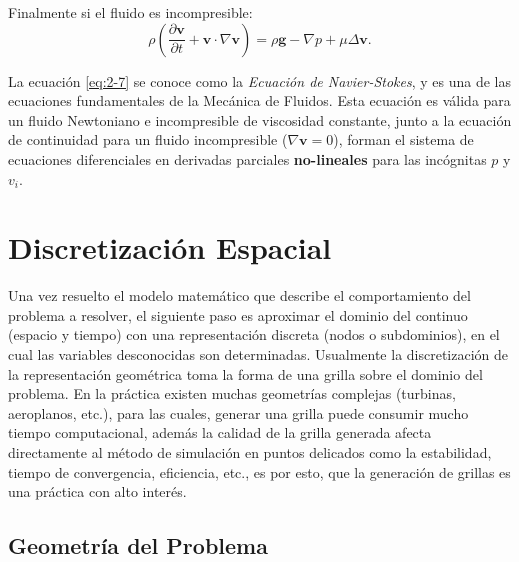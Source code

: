 \documentclass[a4paper,10pt, oneside]{book}
\begin{document}
Finalmente si el fluido es incompresible:
\begin{equation}
	\rho \left( \frac{\partial \mathbf{v}}{\partial t} + \mathbf{v} \cdot \nabla \mathbf{v} \right) = \rho \mathbf{g} -\nabla p + \mu \Delta \mathbf{v}.
	\label{eq:2-7}
\end{equation}

La ecuación \ref{eq:2-7} se conoce como la \textit{Ecuación de Navier-Stokes}, y es una de las ecuaciones fundamentales de la Mecánica de Fluidos. Esta ecuación es válida para un fluido Newtoniano e incompresible de viscosidad constante, junto a la ecuación de continuidad para un fluido incompresible ($\nabla \mathbf{v} = 0$), forman el sistema de ecuaciones diferenciales en derivadas parciales \textbf{no-lineales} para las incógnitas $p$ y $v_i$.

\chapter{Discretización Espacial}

Una vez resuelto el modelo matemático que describe el comportamiento del problema a resolver, el siguiente paso es aproximar el dominio del continuo (espacio y tiempo) con una representación discreta (nodos o subdominios), en el cual las variables desconocidas son determinadas. Usualmente la discretización de la representación geométrica toma la forma de una grilla sobre el dominio del problema. En la práctica existen muchas geometrías complejas (turbinas, aeroplanos, etc.), para las cuales, generar una grilla puede consumir mucho tiempo computacional, además la calidad de la grilla generada afecta directamente al método de simulación en puntos delicados como la estabilidad, tiempo de convergencia, eficiencia, etc., es por esto, que la generación de grillas es una práctica con alto interés.

\section{Geometría del Problema}
\end{document}
